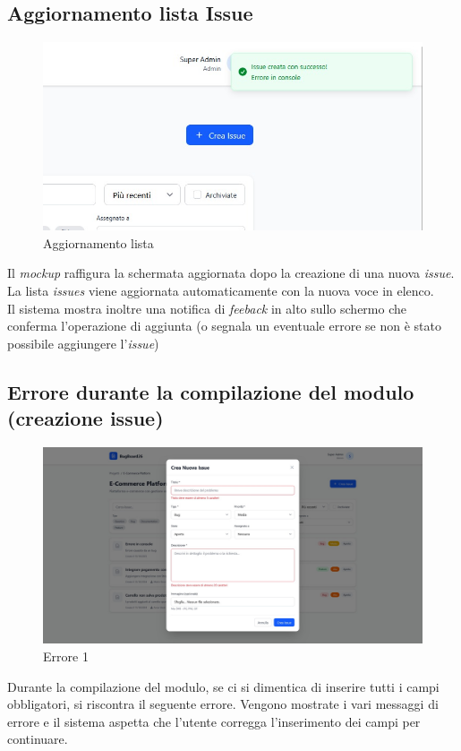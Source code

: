 \subsection{Aggiornamento lista Issue}
\begin{figure}
	\centering
	\includegraphics[width=1\linewidth]{./Assets/Chapters/mkp5.jpg}
	\caption{Aggiornamento lista}
\end{figure}
Il \textit{mockup} raffigura la schermata aggiornata dopo la creazione di una nuova \textit{issue}. La lista \textit{issues} viene aggiornata automaticamente con la nuova voce in elenco.\\
Il sistema mostra inoltre una notifica di \textit{feeback} in alto sullo schermo che conferma l'operazione di aggiunta (o segnala un eventuale errore se non è stato possibile aggiungere l'\textit{issue})

\subsection{Errore durante la compilazione del modulo (creazione issue)}
\begin{figure}
	\centering
	\includegraphics[width=1\linewidth]{./Assets/Chapters/mkp6.jpg}
	\caption{Errore 1}
\end{figure}
Durante la compilazione del modulo, se ci si dimentica di inserire tutti i campi obbligatori, si riscontra il seguente errore. Vengono mostrate i vari messaggi di errore e il sistema aspetta che l'utente corregga l'inserimento dei campi per continuare.

